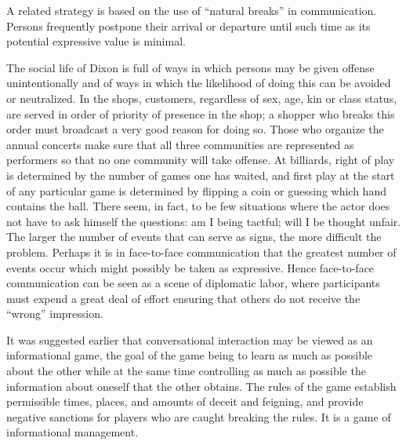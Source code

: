 \documentclass[openany,nobib]{tufte-book}
\begin{document}
A related strategy is based on the use of ``natural breaks'' in
communication. Persons frequently postpone their arrival or departure
until such time as its potential expressive value is minimal.

The social life of Dixon is full of ways in which persons may be given
offense unintentionally and of ways in which the likelihood of doing
this can be avoided or neutralized. In the shops, customers, regardless
of sex, age, kin or class status, are served in order of priority of
presence in the shop; a shopper who breaks this order must broadcast a
very good reason for doing so. Those who organize the annual concerts
make sure that all three communities are represented as performers so
that no one community will take offense. At billiards, right of play is
determined by the number of games one has waited, and first play at the
start of any particular game is determined by flipping a coin or
guessing which hand contains the ball. There seem, in fact, to be few
situations where the actor does not have to ask himself the questions:
am I being tactful; will I be thought unfair. The larger the number of
events that can serve as signs, the more difficult the problem. Perhaps
it is in face-to-face communication that the greatest number of events
occur which might possibly be taken as expressive. Hence face-to-face
communication can be seen as a scene of diplomatic labor, where
participants must expend a great deal of effort ensuring that others do
not receive the ``wrong'' impression.

It was suggested earlier that conversational interaction may be viewed
as an informational game, the goal of the game being to learn as much as
possible about the other while at the same time controlling as much as
possible the information about oneself that the other obtains. The rules
of the game establish permissible times, places, and amounts of deceit
and feigning, and provide negative sanctions for players who are caught
breaking the rules. It is a game of informational management.
\end{document}
